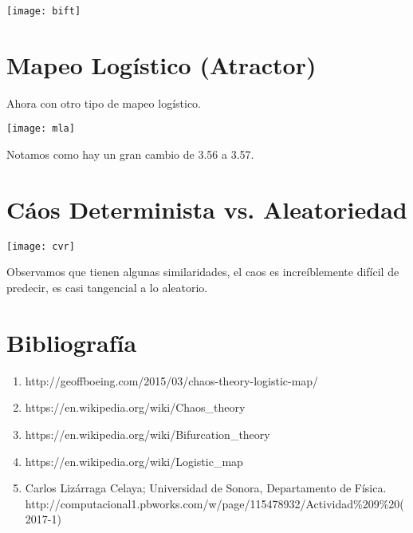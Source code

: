 \documentclass[12pt,a4paper]{article}
\begin{document}
\begin{center}
\texttt{[image: bift]}
\end{center}


\newpage

\section{Mapeo Logístico (Atractor)}

Ahora con otro tipo de mapeo logístico.\\

\begin{center}
\texttt{[image: mla]}
\end{center}

Notamos como hay un gran cambio de 3.56 a 3.57.


\section{Cáos Determinista vs. Aleatoriedad}

\begin{center}
\texttt{[image: cvr]}
\end{center}

Observamos que tienen algunas similaridades, el caos es increíblemente difícil de predecir, es casi tangencial a lo aleatorio.

\section{Bibliografía}

\begin{enumerate}

\item http://geoffboeing.com/2015/03/chaos-theory-logistic-map/

\item https://en.wikipedia.org/wiki/Chaos\_theory

\item https://en.wikipedia.org/wiki/Bifurcation\_theory

\item https://en.wikipedia.org/wiki/Logistic\_map

\item  Carlos Lizárraga Celaya; Universidad de Sonora, Departamento de Física. \\ http://computacional1.pbworks.com/w/page/115478932/Actividad\%209\%20(2017-1)



\end{enumerate}
\end{document}
